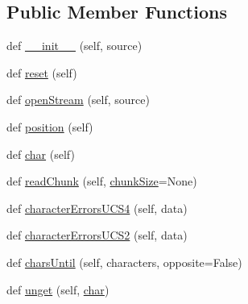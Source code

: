 \subsection*{Public Member Functions}
\begin{DoxyCompactItemize}
\item 
def \hyperlink{classpip_1_1__vendor_1_1html5lib_1_1__inputstream_1_1HTMLUnicodeInputStream_aae329b9a8ec6d32fbe6de851cf40357c}{\+\_\+\+\_\+init\+\_\+\+\_\+} (self, source)
\item 
def \hyperlink{classpip_1_1__vendor_1_1html5lib_1_1__inputstream_1_1HTMLUnicodeInputStream_a6b92704558b31483c618144ab330a58d}{reset} (self)
\item 
def \hyperlink{classpip_1_1__vendor_1_1html5lib_1_1__inputstream_1_1HTMLUnicodeInputStream_af566da94b7a70baa0a20ed78ac41109b}{open\+Stream} (self, source)
\item 
def \hyperlink{classpip_1_1__vendor_1_1html5lib_1_1__inputstream_1_1HTMLUnicodeInputStream_a90c62310ce6ea093a8cd7746c58718f5}{position} (self)
\item 
def \hyperlink{classpip_1_1__vendor_1_1html5lib_1_1__inputstream_1_1HTMLUnicodeInputStream_a6078d7bf2b9ee2304ba083f762440a83}{char} (self)
\item 
def \hyperlink{classpip_1_1__vendor_1_1html5lib_1_1__inputstream_1_1HTMLUnicodeInputStream_ab00c009c094643cbf147905684053c1a}{read\+Chunk} (self, \hyperlink{classpip_1_1__vendor_1_1html5lib_1_1__inputstream_1_1HTMLUnicodeInputStream_a86c396e76c93c5e0eea2d46178b8877a}{chunk\+Size}=None)
\item 
def \hyperlink{classpip_1_1__vendor_1_1html5lib_1_1__inputstream_1_1HTMLUnicodeInputStream_aaa111cb36e1d28c7d8488a90a2ce1cd8}{character\+Errors\+U\+C\+S4} (self, data)
\item 
def \hyperlink{classpip_1_1__vendor_1_1html5lib_1_1__inputstream_1_1HTMLUnicodeInputStream_a9aae3067f7d79c9000704229d3402131}{character\+Errors\+U\+C\+S2} (self, data)
\item 
def \hyperlink{classpip_1_1__vendor_1_1html5lib_1_1__inputstream_1_1HTMLUnicodeInputStream_a86887c79257b9e216a46822fcae18837}{chars\+Until} (self, characters, opposite=False)
\item 
def \hyperlink{classpip_1_1__vendor_1_1html5lib_1_1__inputstream_1_1HTMLUnicodeInputStream_a391fac2e9eee1c0d1f0e3c6223c79fa7}{unget} (self, \hyperlink{classpip_1_1__vendor_1_1html5lib_1_1__inputstream_1_1HTMLUnicodeInputStream_a6078d7bf2b9ee2304ba083f762440a83}{char})
\end{DoxyCompactItemize}

